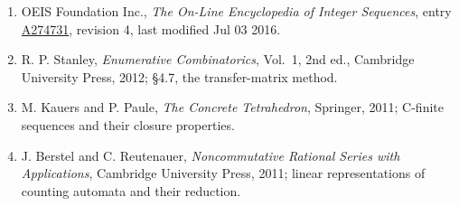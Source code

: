 \documentclass[11pt]{article}
\theoremstyle{definition}
\begin{document}
\begin{enumerate}

\item OEIS Foundation Inc., \emph{The On-Line Encyclopedia of Integer Sequences}, entry \href{https://oeis.org/A274731}{A274731}, revision 4, last modified Jul 03 2016.

\item R. P. Stanley, \emph{Enumerative Combinatorics}, Vol.~1, 2nd ed., Cambridge University Press, 2012; \S4.7, the transfer-matrix method.

\item M. Kauers and P. Paule, \emph{The Concrete Tetrahedron}, Springer, 2011; C-finite sequences and their closure properties.

\item J. Berstel and C. Reutenauer, \emph{Noncommutative Rational Series with Applications}, Cambridge University Press, 2011; linear representations of counting automata and their reduction.

\end{enumerate}
\end{document}
